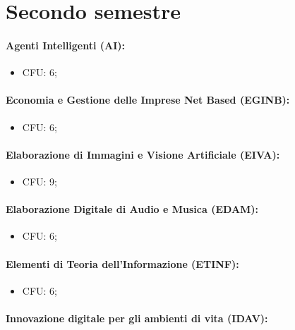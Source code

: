 \section{Secondo semestre}

\paragraph{Agenti Intelligenti (AI):}

\begin{itemize}
  \item CFU: 6;
\end{itemize}

\paragraph{Economia e Gestione delle Imprese Net Based (EGINB):}

\begin{itemize}
  \item CFU: 6;
\end{itemize}

\paragraph{Elaborazione di Immagini e Visione Artificiale (EIVA):}

\begin{itemize}
  \item CFU: 9;
\end{itemize}

\paragraph{Elaborazione Digitale di Audio e Musica (EDAM):}

\begin{itemize}
  \item CFU: 6;
\end{itemize}

\paragraph{Elementi di Teoria dell'Informazione (ETINF):}

\begin{itemize}
  \item CFU: 6;
\end{itemize}

\paragraph{Innovazione digitale per gli ambienti di vita (IDAV):}

